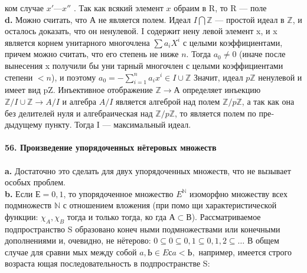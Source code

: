 \documentclass{mai_book}
\begin{document}
ком случае $x' — x''$ . Так как всякий элемент $x$ обраим в R, то R ---\linebreak
поле\\
\hspace*{15pt}\textbf{d.}  Можно считать, что А не является полем. Идеал $I\bigcap\mathbb{Z}$ — простой\linebreak
идеал в $\mathbb{Z}$, и осталось доказать, что он ненулевой. I содержит нену­\linebreak
левой элемент x, и x является корнем унитарного многочлена $\sum a_{i}X^{i}$\linebreak
с целыми коэффициентами, причем можно считать, что его степень\linebreak
не ниже $n$. Тогда $a_0 \neq 0$ (иначе после вынесения x получили бы уни­\linebreak
тарный многочлен с целыми коэффициентами степени $< n$), и поэтому\linebreak
$a_0 = - \sum^{n}_{i = 1}a_{i}x^{i} \in I \cup \mathbb{Z}$ Значит, идеал $p\mathbb{Z}$ ненулевой и имеет вид pZ.\linebreak
Инъективное отображение $\mathbb{Z} \rightarrow А$ определяет инъекцию $\mathbb{Z}/I\cup\mathbb{Z} \rightarrow A/I$\linebreak
и алгебра $A/I$ является алгеброй над полем $\mathbb{Z}/p\mathbb{Z}$, а так как она без\linebreak
делителей нуля и алгебраическая над $\mathbb{Z}/p\mathbb{Z}$, то является полем по пре­\linebreak
дыдущему пункту. Тогда I --- максимальный идеал.\\
\\
\noindent\textbf{56. Произведение упорядоченных нётеровых множеств}\\
\\
\hspace*{15pt}\textbf{a.} Достаточно это сделать для двух упорядоченных множеств, что\linebreak
не вызывает особых проблем.\\
\hspace*{15pt}\textbf{b.} Если $Е = {0,1}$, то упорядоченное множество $E^{\mathbb{N}}$ изоморфно\linebreak
множеству всех подмножеств $\mathbb{N}$ с отношением вложения (при помо­\linebreak
щи характеристической функции: $\chi_A, \chi_B$ тогда и только тогда, ко­\linebreak
гда $А \subset В$). Рассматриваемое подпространство S образовано конеч­\linebreak
ными подмножествами или конечными дополнениями и, очевидно, не\linebreak
нётерово: $0 \subseteq {0} \subseteq {0,1} \subseteq {0,1,2} \subseteq\ldots$ В общем случае для сравни­\linebreak
мых между собой $a, Ь \in E с a < Ь,$ например, имеется строго возраста­\linebreak
ющая последовательность в подпространстве S:
\end{document}
